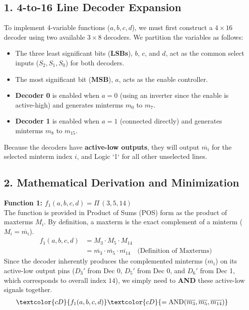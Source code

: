 \documentclass[12pt,a3paper]{article}
\begin{document}
\begin{enumerate}
\begin{tcolorbox}[enhanced,breakable,ansbox,colback=cD!4,colframe=cD,boxrule=0.8pt,arc=5pt,title={\textbf{Answer}},fonttitle=\bfseries\color{white},colbacktitle=cD]
\subsection*{1. 4-to-16 Line Decoder Expansion}
To implement 4-variable functions ($a, b, c, d$), we must first construct a $4 \times 16$ decoder using two available $3 \times 8$ decoders. We partition the variables as follows:
\begin{itemize}
    \item The three least significant bits (\textbf{LSBs}), $b$, $c$, and $d$, act as the common select inputs ($S_2, S_1, S_0$) for both decoders.
    \item The most significant bit (\textbf{MSB}), $a$, acts as the enable controller. 
    \item \textbf{Decoder 0} is enabled when $a = 0$ (using an inverter since the enable is active-high) and generates minterms $m_0$ to $m_7$.
    \item \textbf{Decoder 1} is enabled when $a = 1$ (connected directly) and generates minterms $m_8$ to $m_{15}$.
\end{itemize}
Because the decoders have \textbf{active-low outputs}, they will output $\overline{m_i}$ for the selected minterm index $i$, and Logic `1` for all other unselected lines.

\subsection*{2. Mathematical Derivation and Minimization}

\textbf{Function 1: $f_1(a,b,c,d) = \Pi\,(3,5,14)$} \\
The function is provided in Product of Sums (POS) form as the product of maxterms $M_i$. 
By definition, a maxterm is the exact complement of a minterm ($M_i = \overline{m_i}$). 
\begin{align*}
    f_1(a,b,c,d) &= M_3 \cdot M_5 \cdot M_{14} \\
    &= \overline{m_3} \cdot \overline{m_5} \cdot \overline{m_{14}} \quad \text{(Definition of Maxterms)}
\end{align*}
Since the decoder inherently produces the complemented minterms ($\overline{m_i}$) on its active-low output pins ($D_3'$ from Dec 0, $D_5'$ from Dec 0, and $D_6'$ from Dec 1, which corresponds to overall index $14$), we simply need to \textbf{AND} these active-low signals together.
\begin{align*}
    \textcolor{cD}{f_1(a,b,c,d)} &\textcolor{cD}{= \text{AND}(\overline{m_3}, \overline{m_5}, \overline{m_{14}})}
\end{align*}


\end{tcolorbox}
\end{enumerate}
\end{document}
